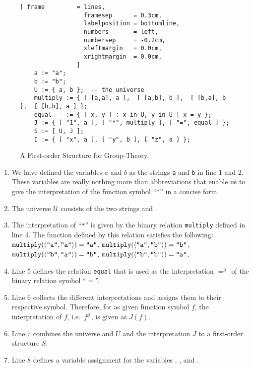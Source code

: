 \begin{figure}[!ht]
\centering
\begin{Verbatim}[ frame         = lines, 
                  framesep      = 0.3cm, 
                  labelposition = bottomline,
                  numbers       = left,
                  numbersep     = -0.2cm,
                  xleftmargin   = 0.0cm,
                  xrightmargin  = 0.0cm,
                ]
    a := "a";
    b := "b";  
    U := { a, b };  -- the universe
    multiply := { [ [a,a], a ],  [ [a,b], b ],  [ [b,a], b ],  [ [b,b], a ] };
    equal    := { [ x, y ] : x in U, y in U | x = y };
    J := { [ "1", a ], [ "*", multiply ], [ "=", equal ] };
    S := [ U, J ];
    I := { [ "x", a ], [ "y", b ], [ "z", a ] }; 
\end{Verbatim}
\vspace*{-0.3cm}
\caption{A First-order Structure for Group-Theory.}
\label{fig:gruppen.stl}
\end{figure}

\begin{enumerate}
\item We have defined the variables $a$ and $b$
      as the strings \texttt{a} and \texttt{b} in line
      1 and 2.  These variables are really nothing more than abbreviations that enable us to give the 
      interpretation of the function symbol  ``$*$'' in a concise form.
\item The universe  $\mathcal{U}$ consists of the two strings   and .
\item The interpretation of ``\texttt{*}'' is given by the binary relation  \texttt{multiply}
      defined in line 4.  The function defined by this relation satisfies the following:
      \\[0.2cm]
      \hspace*{1.3cm}
      $\mathtt{multiply}(\pair(\quoted{a},\quoted{a})) = \quoted{a}$, \quad
      $\mathtt{multiply}(\pair(\quoted{a},\quoted{b})) = \quoted{b}$, 
      \\[0.2cm]
      \hspace*{1.3cm}
      $\mathtt{multiply}(\pair(\quoted{b},\quoted{a})) = \quoted{b}$, \quad
      $\mathtt{multiply}(\pair(\quoted{b},\quoted{b})) = \quoted{a}$.      
\item Line  5 defines the relation \texttt{equal} that is used as the interpretation
      $=^\mathcal{J}$ of the binary relation symbol ``$=$''. 
\item Line 6 collects the different interpretations and assigns them to their respective
      symbol.  Therefore, for as given function symbol $f$, the interpretation of $f$, 
      i.e.~$f^\mathcal{J}$, is given as $J(f)$.  
\item Line 7 combines the universe and $U$ and the interpretation $J$ to a first-order
      structure $S$.
\item Line 8 defines a variable assignment for the variables , , and .
\end{enumerate}


